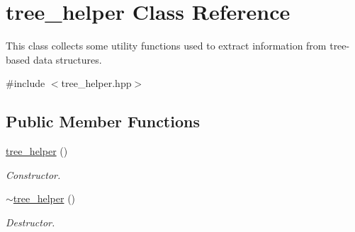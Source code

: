 \hypertarget{classtree__helper}{}\section{tree\+\_\+helper Class Reference}
\label{classtree__helper}


This class collects some utility functions used to extract information from tree-\/based data structures.  




{\ttfamily \#include $<$tree\+\_\+helper.\+hpp$>$}

\subsection*{Public Member Functions}
\begin{DoxyCompactItemize}
\item 
\hyperlink{classtree__helper_ab6ec2ef34b9c0fdb5ee4f14e2bf8ad90}{tree\+\_\+helper} ()
\begin{DoxyCompactList}\small\item\em Constructor. \end{DoxyCompactList}\item 
\hyperlink{classtree__helper_a8c1bf5aa8d055290ce98a45ec71b1ab9}{$\sim$tree\+\_\+helper} ()
\begin{DoxyCompactList}\small\item\em Destructor. \end{DoxyCompactList}\end{DoxyCompactItemize}

